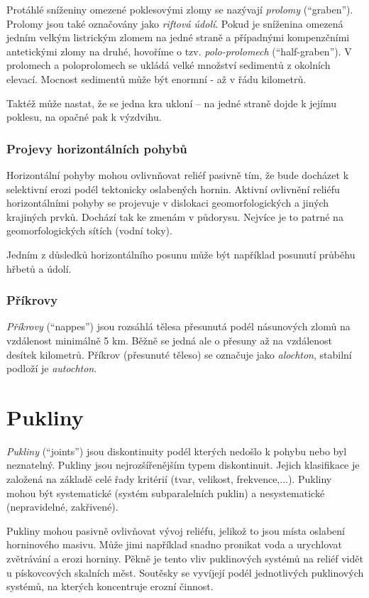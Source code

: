 Protáhlé sníženiny omezené poklesovými zlomy se nazývají \emph{prolomy} (\enquote{graben}). Prolomy jsou také označovány jako \emph{riftová údolí}.  Pokud je sníženina omezená jedním velkým listrickým zlomem na jedné straně a případnými kompenzčními antetickými zlomy na druhé, hovoříme o tzv. \emph{polo-prolomech} (\enquote{half-graben}). V prolomech a  poloprolomech se ukládá velké množství sedimentů z okolních elevací. Mocnost sedimentů může být enormní - až v řádu kilometrů.

Taktéž může nastat, že se jedna kra ukloní -- na jedné straně dojde k jejímu poklesu, na opačné pak k výzdvihu. 

\subsubsection{Projevy horizontálních pohybů}

Horizontální pohyby mohou ovlivnňovat reliéf pasivně tím, že bude docházet k selektivní erozi podél tektonicky oslabených hornin. Aktivní ovlivnění reliéfu horizontálními pohyby se projevuje v dislokaci geomorfologických a jiných krajiných prvků. Dochází tak ke zmenám v půdorysu. Nejvíce je to patrné na geomorfologických sítích (vodní toky).

Jedním z důsledků horizontálního posunu může být například posunutí průběhu hřbetů a údolí.

\subsubsection{Příkrovy}
\emph{Příkrovy} (\enquote{nappes}) jsou rozsáhlá tělesa přesunutá podél násunových zlomů na vzdálenost minimálně 5 km. Běžně se jedná ale o přesuny až na vzdálenost desítek kilometrů. Příkrov (přesunuté těleso) se označuje jako \emph{alochton}, stabilní podloží je \emph{autochton}.

\section{Pukliny}
\emph{Pukliny} (\enquote{joints}) jsou diskontinuity podél kterých nedošlo k pohybu nebo byl neznatelný. Pukliny jsou nejrozšířenějším typem diskontinuit. Jejich klasifikace je založená na základě celé řady kritérií (tvar, velikost, frekvence,...). Pukliny mohou být systematické (systém subparalelních puklin) a nesystematické (nepravidelné, zakřivené). 

Pukliny mohou pasivně ovlivňovat vývoj reliéfu, jelikož to jsou místa oslabení horninového masivu. Může jimi například snadno pronikat voda a urychlovat zvětrávání a erozi horniny. Pěkně je tento vliv puklinových systémů na reliéf vidět u pískovcových skalních měst. Soutěsky se vyvíjejí podél jednotlivých puklinových systémů, na kterých koncentruje erozní činnost.

